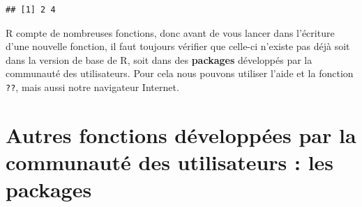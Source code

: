 \documentclass[]{book}
\newenvironment{Shaded}{\begin{snugshade}}{\end{snugshade}}
\newcommand{\CommentTok}[1]{\textcolor[rgb]{0.56,0.35,0.01}{\textit{#1}}}
\newcommand{\ControlFlowTok}[1]{\textcolor[rgb]{0.13,0.29,0.53}{\textbf{#1}}}
\newcommand{\DataTypeTok}[1]{\textcolor[rgb]{0.13,0.29,0.53}{#1}}
\newcommand{\DecValTok}[1]{\textcolor[rgb]{0.00,0.00,0.81}{#1}}
\newcommand{\KeywordTok}[1]{\textcolor[rgb]{0.13,0.29,0.53}{\textbf{#1}}}
\newcommand{\NormalTok}[1]{#1}
\newcommand{\OperatorTok}[1]{\textcolor[rgb]{0.81,0.36,0.00}{\textbf{#1}}}
\newcommand{\StringTok}[1]{\textcolor[rgb]{0.31,0.60,0.02}{#1}}
\begin{document}
\begin{Shaded}
\end{Shaded}

\begin{verbatim}
## [1] 2 4
\end{verbatim}

R compte de nombreuses fonctions, donc avant de vous lancer dans l'écriture d'une nouvelle fonction, il faut toujours vérifier que celle-ci n'existe pas déjà soit dans la version de base de R, soit dans des \textbf{packages} développés par la communauté des utilisateurs. Pour cela nous pouvons utiliser l'aide et la fonction \texttt{??}, mais aussi notre navigateur Internet.

\hypertarget{autres-fonctions-developpees-par-la-communaute-des-utilisateurs-les-packages}{%
\section{Autres fonctions développées par la communauté des utilisateurs : les packages}\label{autres-fonctions-developpees-par-la-communaute-des-utilisateurs-les-packages}}
\end{document}
